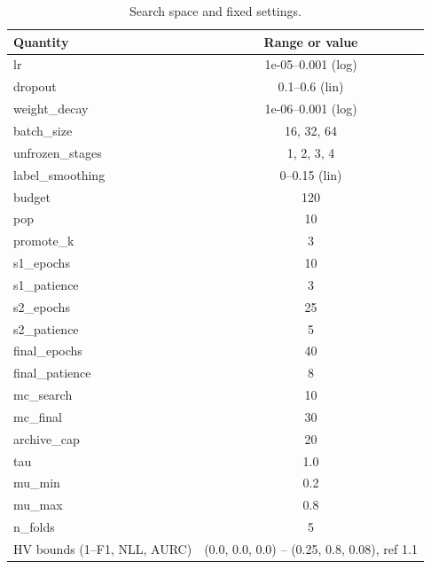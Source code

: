 \begin{table}[t]
\centering
\caption{Search space and fixed settings.}
\label{tab:table2_search_space}
\small
\begin{tabular}{lc}
\toprule
Quantity & Range or value \\
\midrule
lr & 1e-05–0.001 (log) \\
dropout & 0.1–0.6 (lin) \\
weight\_decay & 1e-06–0.001 (log) \\
batch\_size & {16, 32, 64} \\
unfrozen\_stages & {1, 2, 3, 4} \\
label\_smoothing & 0–0.15 (lin) \\
budget & 120 \\
pop & 10 \\
promote\_k & 3 \\
s1\_epochs & 10 \\
s1\_patience & 3 \\
s2\_epochs & 25 \\
s2\_patience & 5 \\
final\_epochs & 40 \\
final\_patience & 8 \\
mc\_search & 10 \\
mc\_final & 30 \\
archive\_cap & 20 \\
tau & 1.0 \\
mu\_min & 0.2 \\
mu\_max & 0.8 \\
n\_folds & 5 \\
HV bounds (1--F1, NLL, AURC) & (0.0, 0.0, 0.0) – (0.25, 0.8, 0.08), ref 1.1 \\
\bottomrule
\end{tabular}
\end{table}
